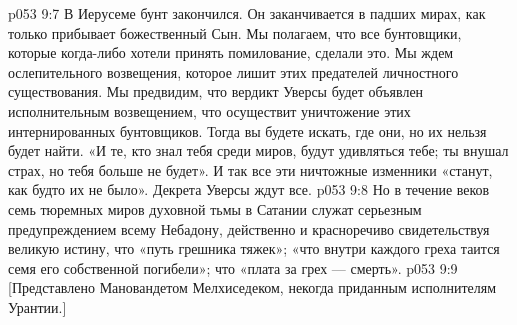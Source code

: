 \vs p053 9:7 В Иерусеме бунт закончился. Он заканчивается в падших мирах, как только прибывает божественный Сын. Мы полагаем, что все бунтовщики, которые когда\hyp{}либо хотели принять помилование, сделали это. Мы ждем ослепительного возвещения, которое лишит этих предателей личностного существования. Мы предвидим, что вердикт Уверсы будет объявлен исполнительным возвещением, что осуществит уничтожение этих интернированных бунтовщиков. Тогда вы будете искать, где они, но их нельзя будет найти. «И те, кто знал тебя среди миров, будут удивляться тебе; ты внушал страх, но тебя больше не будет». И так все эти ничтожные изменники «станут, как будто их не было». Декрета Уверсы ждут все.
\vs p053 9:8 Но в течение веков семь тюремных миров духовной тьмы в Сатании служат серьезным предупреждением всему Небадону, действенно и красноречиво свидетельствуя великую истину, что «путь грешника тяжек»; «что внутри каждого греха таится семя его собственной погибели»; что «плата за грех --- смерть».
\vs p053 9:9 [Представлено Мановандетом Мелхиседеком, некогда приданным исполнителям Урантии.]
